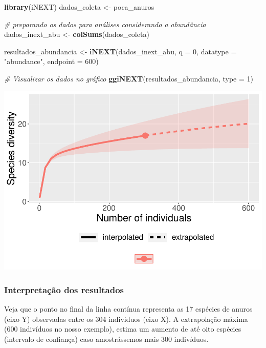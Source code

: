 \documentclass[
]{book}
\newenvironment{Shaded}{\begin{snugshade}}{\end{snugshade}}
\newcommand{\CommentTok}[1]{\textcolor[rgb]{0.56,0.35,0.01}{\textit{#1}}}
\newcommand{\DataTypeTok}[1]{\textcolor[rgb]{0.13,0.29,0.53}{#1}}
\newcommand{\DecValTok}[1]{\textcolor[rgb]{0.00,0.00,0.81}{#1}}
\newcommand{\KeywordTok}[1]{\textcolor[rgb]{0.13,0.29,0.53}{\textbf{#1}}}
\newcommand{\NormalTok}[1]{#1}
\newcommand{\StringTok}[1]{\textcolor[rgb]{0.31,0.60,0.02}{#1}}
\begin{document}
\begin{Shaded}
\begin{Highlighting}[]
\KeywordTok{library}\NormalTok{(iNEXT)}
\NormalTok{dados_coleta <-}\StringTok{ }\NormalTok{poca_anuros}

\CommentTok{# preparando os dados para análises considerando a abundância}
\NormalTok{dados_inext_abu <-}\StringTok{ }\KeywordTok{colSums}\NormalTok{(dados_coleta) }

\NormalTok{resultados_abundancia <-}\StringTok{ }\KeywordTok{iNEXT}\NormalTok{(dados_inext_abu, }\DataTypeTok{q =} \DecValTok{0}\NormalTok{, }\DataTypeTok{datatype =} \StringTok{"abundance"}\NormalTok{, }
			\DataTypeTok{endpoint =} \DecValTok{600}\NormalTok{)}

\CommentTok{# Visualizar os dados no gráfico}
\KeywordTok{ggiNEXT}\NormalTok{(resultados_abundancia, }\DataTypeTok{type =} \DecValTok{1}\NormalTok{)}
\end{Highlighting}
\end{Shaded}

\includegraphics{livro_r_ecologia_files/figure-latex/unnamed-chunk-55-1.pdf}

\hypertarget{interpretauxe7uxe3o-dos-resultados-6}{%
\subsubsection{Interpretação dos resultados}\label{interpretauxe7uxe3o-dos-resultados-6}}

Veja que o ponto no final da linha contínua representa as 17 espécies de anuros (eixo Y) observadas entre os 304 individuos (eixo X). A extrapolação máxima (600 indivíduos no nosso exemplo), estima um aumento de até oito espécies (intervalo de confiança) caso amostrássemos mais 300 indivíduos.
\end{document}
